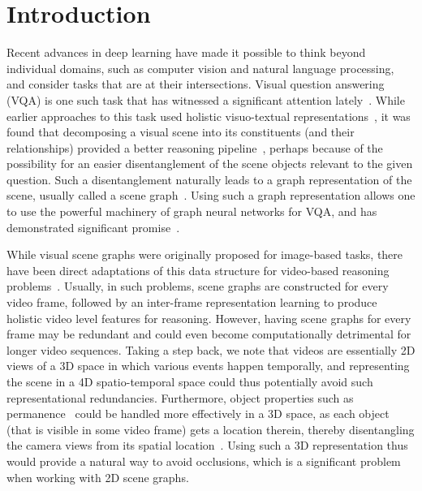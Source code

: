 \documentclass[letterpaper]{article}
\begin{document}
\section{Introduction}
Recent advances in deep learning have made it possible to think beyond individual domains, such as computer vision and natural language processing, and consider tasks that are at their intersections. Visual question answering (VQA) is one such task that has witnessed a significant attention lately~\cite{antol2015vqa,anderson2018bottom,wu2017visual,jang2017tgif,geng2021dynamic,chen2020counterfactual,ghosh2019generating}. While earlier approaches to this task used holistic visuo-textual representations~\cite{dang2021hierarchical,antol2015vqa}, it was found that decomposing a visual scene into its constituents (and their relationships) provided a better reasoning pipeline~\cite{anderson2018bottom,johnson2015image,krishna2017visual,dornadula2019visual}, perhaps because of the possibility for an easier disentanglement of the scene objects relevant to the given question. Such a disentanglement naturally leads to a graph representation of the scene, usually called a scene graph~\cite{johnson2015image}. Using such a graph representation allows one to use the powerful machinery of graph neural networks for VQA, and has demonstrated significant promise~\cite{li2019know,li2019relation,pan2020spatio,geng2021dynamic}.

While visual scene graphs were originally proposed for image-based tasks, there have been direct adaptations of this data structure for video-based reasoning problems~\cite{geng2021dynamic,chatterjee2021visual,pan2020spatio,herzig2019spatio}. Usually, in such problems, scene graphs are constructed for every video frame, followed by an inter-frame representation learning to produce holistic video level features for reasoning. However, having scene graphs for every frame may be redundant and could even become computationally detrimental for longer video sequences. Taking a step back, we note that videos are essentially 2D views of a 3D space in which various events happen temporally, and representing the scene in a 4D spatio-temporal space could thus potentially avoid such representational redundancies. Furthermore, object properties such as permanence~\cite{shamsian2020learning} could be handled more effectively in a 3D space, as each object (that is visible in some video frame) gets a location therein, thereby disentangling the camera views from its spatial location~\cite{tung20203d,girdhar2019cater}. Using such a 3D representation thus would provide a natural way to avoid occlusions, which is a significant problem when working with 2D scene graphs.
\end{document}

